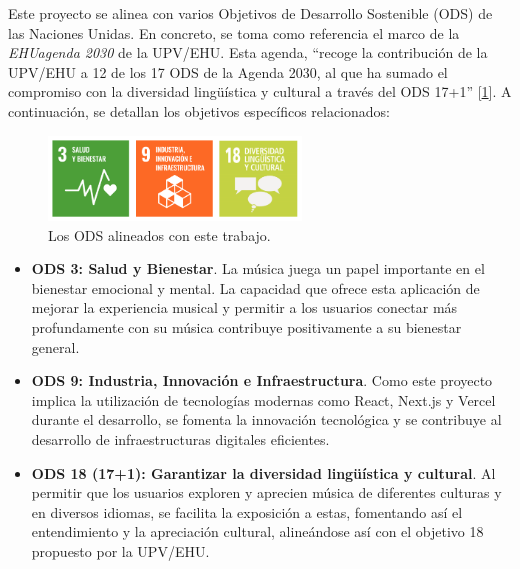 Este proyecto se alinea con varios Objetivos de Desarrollo Sostenible (ODS) de las Naciones Unidas. En concreto, se toma como referencia el marco de la \textit{EHUagenda 2030} de la UPV/EHU. Esta agenda, ``recoge la contribución de la UPV/EHU a 12 de los 17 ODS de la Agenda 2030, al que ha sumado el compromiso con la diversidad lingüística y cultural a través del ODS 17+1'' [\hyperref[ch:bib]{1}]. A continuación, se detallan los objetivos específicos relacionados:

\begin{figure}[h]
    \centering
    \includegraphics[width=0.6\textwidth]{figures/tres_ods_relacionadas.png}
    \caption{Los ODS alineados con este trabajo.}
\end{figure}

\begin{itemize}
    \item \textbf{ODS 3: Salud y Bienestar}. La música juega un papel importante en el bienestar emocional y mental. La capacidad que ofrece esta aplicación de mejorar la experiencia musical y permitir a los usuarios conectar más profundamente con su música contribuye positivamente a su bienestar general.
    \item \textbf{ODS 9: Industria, Innovación e Infraestructura}. Como este proyecto implica la utilización de tecnologías modernas como React, Next.js y Vercel durante el desarrollo, se fomenta la innovación tecnológica y se contribuye al desarrollo de infraestructuras digitales eficientes.
    \item \textbf{ODS 18 (17+1): Garantizar la diversidad lingüística y cultural}. Al permitir que los usuarios exploren y aprecien música de diferentes culturas y en diversos idiomas, se facilita la exposición a estas, fomentando así el entendimiento y la apreciación cultural, alineándose así con el objetivo 18 propuesto por la UPV/EHU.
\end{itemize}